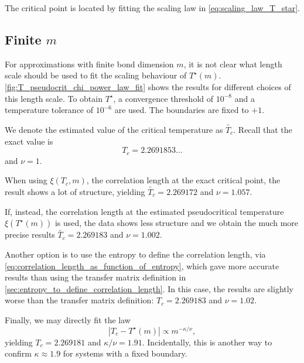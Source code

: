 The critical point is located by fitting the scaling law in \autoref{eq:scaling_law_T_star}.

\subsection{Finite $m$}
For approximations with finite bond dimension $m$, it is not clear what length scale should be used to fit the scaling
behaviour of $T^{\star}(m)$.
\autoref{fig:T_pseudocrit_chi_power_law_fit} shows the results for different choices of this length scale.
To obtain $T^{\star}$, a convergence threshold of $10^{-8}$ and a temperature tolerance of $10^{-6}$ are used.
The boundaries are fixed to $+1$.


We denote the estimated value of the critical temperature as $\widetilde{T_c}$. Recall that the exact value is
\begin{equation}
  T_c = 2.2691853\dots
\end{equation}
and $\nu = 1$.

When using $\xi(T_c, m)$, the correlation length at the exact critical point,
the result shows a lot of structure, yielding $\widetilde{T_c} = 2.269172$ and $\nu = 1.057$.

If, instead, the correlation length at the estimated pseudocritical temperature $\xi(T^{\star}(m))$ is used,
the data shows less structure and we obtain the much more precise results $\widetilde{T_c} = 2.269183$ and $\nu =
1.002$.

Another option is to use the entropy to define the correlation length,
via \autoref{eq:correlation_length_as_function_of_entropy}, which gave more accurate results than using the transfer
matrix definition in \autoref{sec:entropy_to_define_correlation_length}.
In this case, the results are slightly worse than the transfer matrix definition:
$T_c = 2.269183$ and $\nu = 1.02$.

Finally, we may directly fit the law
\begin{equation}
  |T_c - T^{\star}(m)| \propto m^{-\kappa/\nu},
\end{equation}
yielding $T_c = 2.269181$ and $\kappa/\nu = 1.91$.
Incidentally, this is another way to confirm $\kappa \approx 1.9$ for systems with a fixed boundary.



